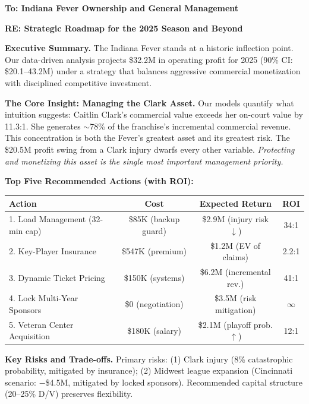 \documentclass{mcmthesis}
\begin{document}
\begin{letter}{\textbf{To: Indiana Fever Ownership and General Management}}

\vspace{0.2cm}
\noindent\textbf{RE: Strategic Roadmap for the 2025 Season and Beyond}

\vspace{0.2cm}
\noindent\textbf{Executive Summary.} The Indiana Fever stands at a historic inflection point. Our data-driven analysis projects \$32.2M in operating profit for 2025 (90\% CI: \$20.1--43.2M) under a strategy that balances aggressive commercial monetization with disciplined competitive investment.

\vspace{0.15cm}
\noindent\textbf{The Core Insight: Managing the Clark Asset.} Our models quantify what intuition suggests: Caitlin Clark's commercial value exceeds her on-court value by 11.3:1. She generates $\sim$78\% of the franchise's incremental commercial revenue. This concentration is both the Fever's greatest asset and its greatest risk. The \$20.5M profit swing from a Clark injury dwarfs every other variable. \textit{Protecting and monetizing this asset is the single most important management priority.}

\vspace{0.15cm}
\noindent\textbf{Top Five Recommended Actions (with ROI):}

\begin{table}[H]
\centering
\small
\begin{tabular}{lccc}
\toprule
\textbf{Action} & \textbf{Cost} & \textbf{Expected Return} & \textbf{ROI} \\
\midrule
1. Load Management (32-min cap) & \$85K (backup guard) & \$2.9M (injury risk $\downarrow$) & 34:1 \\
2. Key-Player Insurance & \$547K (premium) & \$1.2M (EV of claims) & 2.2:1 \\
3. Dynamic Ticket Pricing & \$150K (systems) & \$6.2M (incremental rev.) & 41:1 \\
4. Lock Multi-Year Sponsors & \$0 (negotiation) & \$3.5M (risk mitigation) & $\infty$ \\
5. Veteran Center Acquisition & \$180K (salary) & \$2.1M (playoff prob. $\uparrow$) & 12:1 \\
\bottomrule
\end{tabular}
\end{table}

\vspace{0.1cm}
\noindent\textbf{Key Risks and Trade-offs.} Primary risks: (1) Clark injury (8\% catastrophic probability, mitigated by insurance); (2) Midwest league expansion (Cincinnati scenario: $-$\$4.5M, mitigated by locked sponsors). Recommended capital structure (20--25\% D/V) preserves flexibility.


\end{letter}
\end{document}

